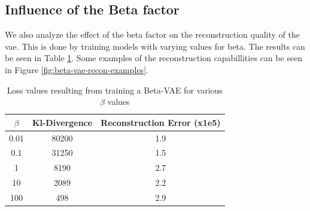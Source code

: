\subsection{Influence of the Beta factor}
We also analyze the effect of the beta factor on the reconstruction quality of the vae. This is done by training models with varying values for beta. The results can be seen in Table \ref{tab:beta-vae-loss-values}. Some examples of the reconstruction capabillities can be seen in Figure \ref{fig:beta-vae-recon-examples}.

\begin{table}[!ht]
    \centering
    \caption{Loss values resulting from training a Beta-VAE for various $\beta$ values}
    \label{tab:beta-vae-loss-values}
    \begin{tabular}{ccc}
        \hline
        $\beta$ & Kl-Divergence & Reconstruction Error (x1e5) \\
        \hline
        0.01    & 80200         & 1.9                         \\
        0.1     & 31250         & 1.5                         \\
        1       & 8190          & 2.7                         \\
        10      & 2089          & 2.2                         \\
        100     & 498           & 2.9                         \\
        \hline
    \end{tabular}
\end{table}

